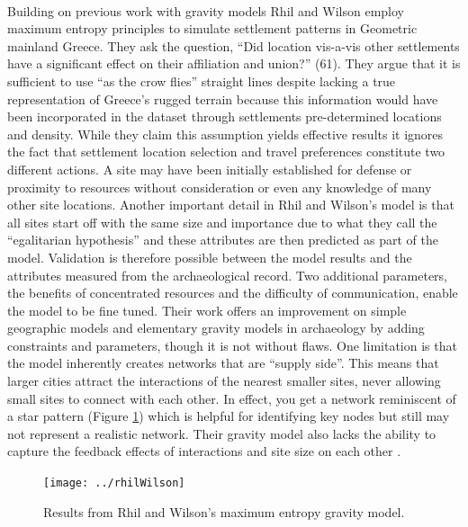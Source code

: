 \documentclass[12pt,a4paper]{thesis}
\begin{document}
\paragraph{}
Building on previous work with gravity models Rhil and Wilson \citeyearpar{RihWil91} employ maximum entropy principles to simulate settlement patterns in Geometric mainland Greece. They ask the question, ``Did location vis-a-vis other settlements have a significant effect on their affiliation and union?'' (61). They argue that it is sufficient to use ``as the crow flies'' straight lines despite lacking a true representation of Greece's rugged terrain because this information would have been incorporated in the dataset through settlements pre-determined locations and density. While they claim this assumption yields effective results it ignores the fact that settlement location selection and travel preferences constitute two different actions. A site may have been initially established for defense or proximity to resources without consideration or even any knowledge of many other site locations. Another important detail in Rhil and Wilson's model is that all sites start off with the same size and importance due to what they call the ``egalitarian hypothesis'' and these attributes are then predicted as part of the model. Validation is therefore possible between the model results and the attributes measured from the archaeological record. Two additional parameters, the benefits of concentrated resources and the difficulty of communication, enable the model to be fine tuned.   Their work offers an improvement on simple geographic models and elementary gravity models in archaeology by adding constraints and parameters, though it is not without flaws.  One limitation is that the model inherently creates networks that are ``supply side''. This means that larger cities attract the interactions of the nearest smaller sites, never allowing small sites to connect with each other. In effect, you get a network reminiscent of a star pattern (Figure \ref{fig:rhilWilson}) which is helpful for identifying key nodes but still may not represent a realistic network. Their gravity model also lacks the ability to capture the feedback effects of interactions and site size on each other \cite[10]{KnaEvaRiv08}.

\begin{figure}
\centering
\texttt{[image: ../rhilWilson]}
\caption{Results from Rhil and Wilson's maximum entropy gravity model.}
\label{fig:rhilWilson}
\end{figure}
\end{document}
